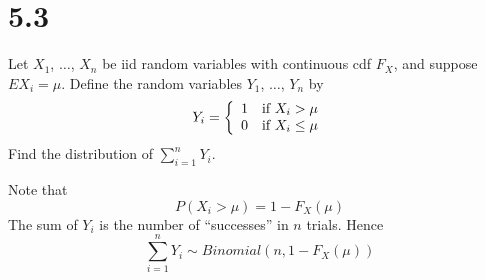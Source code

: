 \section*{5.3}
Let $X_1$, $\ldots$, $X_n$ be iid random variables with continuous
cdf $F_X$, and suppose $EX_i=\mu$.
Define the random variables $Y_1$, $\ldots$, $Y_n$ by
\begin{displaymath}
Y_i=\left\{
\begin{array}{ll}
1 & \hbox{if $X_i>\mu$}\\
0 & \hbox{if $X_i\le\mu$}
\end{array}\right.
\end{displaymath}
Find the distribution of $\sum_{i=1}^n Y_i$.

\bigskip
\noindent
Note that
$$P(X_i>\mu)=1-F_X(\mu)$$
The sum of $Y_i$ is the number of ``successes'' in $n$ trials.
Hence
$$\sum_{i=1}^n Y_i\sim Binomial(n,1-F_X(\mu))$$

